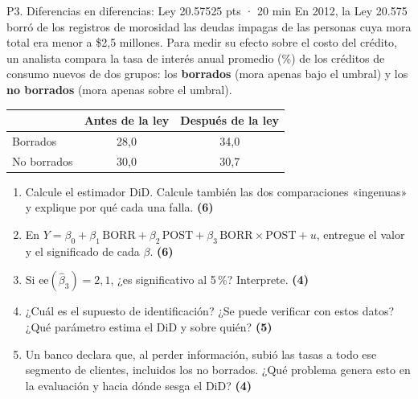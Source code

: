 \documentclass[11pt,a4paper]{article}
\newcommand{\pts}[1]{\hfill\textbf{\small(#1)}}
\begin{document}
\begin{preg}{P3. Diferencias en diferencias: Ley 20.575}{25 pts · 20 min}
En 2012, la Ley 20.575 borró de los registros de morosidad las deudas impagas de las personas cuya mora total era menor a \$2,5 millones. Para medir su efecto sobre el costo del crédito, un analista compara la tasa de interés anual promedio (\%) de los créditos de consumo nuevos de dos grupos: los \textbf{borrados} (mora apenas bajo el umbral) y los \textbf{no borrados} (mora apenas sobre el umbral).
\begin{center}\small
\begin{tabular}{lcc}\toprule
 & Antes de la ley & Después de la ley\\\midrule
Borrados & 28,0 & 34,0\\
No borrados & 30,0 & 30,7\\\bottomrule
\end{tabular}
\end{center}
\begin{enumerate}[label=\alph*),leftmargin=*,itemsep=2pt]
\item Calcule el estimador DiD. Calcule también las dos comparaciones «ingenuas» y explique por qué cada una falla. \pts{6}
\item En $Y=\beta_0+\beta_1\,\text{BORR}+\beta_2\,\text{POST}+\beta_3\,\text{BORR}\times\text{POST}+u$, entregue el valor y el significado de cada $\beta$. \pts{6}
\item Si $\text{ee}(\hat\beta_3)=2{,}1$, ¿es significativo al 5\,\%? Interprete. \pts{4}
\item ¿Cuál es el supuesto de identificación? ¿Se puede verificar con estos datos? ¿Qué parámetro estima el DiD y sobre quién? \pts{5}
\item Un banco declara que, al perder información, subió las tasas a todo ese segmento de clientes, incluidos los no borrados. ¿Qué problema genera esto en la evaluación y hacia dónde sesga el DiD? \pts{4}
\end{enumerate}
\end{preg}
\end{document}
